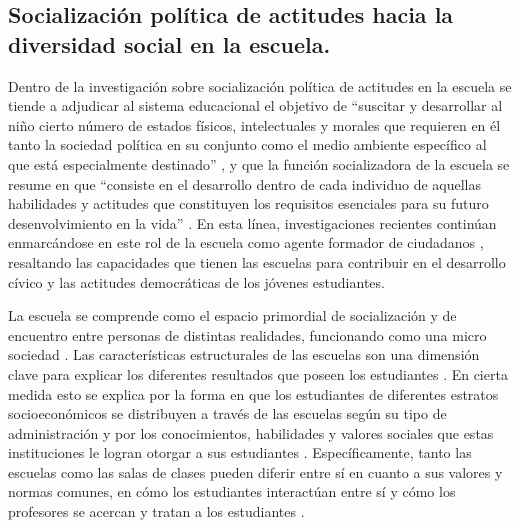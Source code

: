 \documentclass[12pt,twoside]{templates/facsothesis}
\begin{document}
\hypertarget{socializaciuxf3n-poluxedtica-de-actitudes-hacia-la-diversidad-social-en-la-escuela.}{%
\subsection{Socialización política de actitudes hacia la diversidad social en la escuela.}\label{socializaciuxf3n-poluxedtica-de-actitudes-hacia-la-diversidad-social-en-la-escuela.}}

Dentro de la investigación sobre socialización política de actitudes en la escuela se tiende a adjudicar al sistema educacional el objetivo de ``suscitar y desarrollar al niño cierto número de estados físicos, intelectuales y morales que requieren en él tanto la sociedad política en su conjunto como el medio ambiente específico al que está especialmente destinado'' \citep[p.~60]{durkheim_educacion_1999}, y que la función socializadora de la escuela se resume en que ``consiste en el desarrollo dentro de cada individuo de aquellas habilidades y actitudes que constituyen los requisitos esenciales para su futuro desenvolvimiento en la vida'' \citep[p.~65]{parsons_clase_1976}. En esta línea, investigaciones recientes continúan enmarcándose en este rol de la escuela como agente formador de ciudadanos \citep{cox_Aprendizaje_2015, groof_Influence_2008, trevino_Influence_2017}, resaltando las capacidades que tienen las escuelas para contribuir en el desarrollo cívico y las actitudes democráticas de los jóvenes estudiantes.

La escuela se comprende como el espacio primordial de socialización y de encuentro entre personas de distintas realidades, funcionando como una micro sociedad \citep{groof_Influence_2008}. Las características estructurales de las escuelas son una dimensión clave para explicar los diferentes resultados que poseen los estudiantes \citep{trevino_Influence_2018}. En cierta medida esto se explica por la forma en que los estudiantes de diferentes estratos socioeconómicos se distribuyen a través de las escuelas según su tipo de administración \citep{bellei_estudio_2013} y por los conocimientos, habilidades y valores sociales que estas instituciones le logran otorgar a sus estudiantes \citep{groof_Influence_2008}. Específicamente, tanto las escuelas como las salas de clases pueden diferir entre sí en cuanto a sus valores y normas comunes, en cómo los estudiantes interactúan entre sí y cómo los profesores se acercan y tratan a los estudiantes \citep{bayramozdemir_How_2020}.
\end{document}
